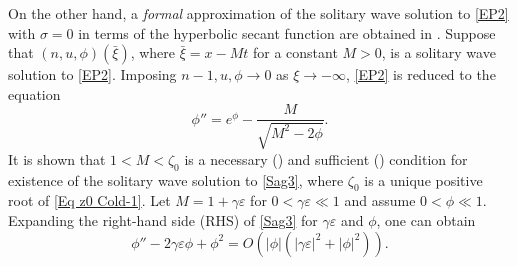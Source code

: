 \documentclass{amsart}
\newcommand{\veps}{\varepsilon}
\numberwithin{equation}{section}
\theoremstyle{plain}%
\theoremstyle{definition}
\theoremstyle{remark}
\theoremstyle{remark}
\begin{document}
On the other hand, a \emph{formal} approximation of the solitary wave solution to \eqref{EP2} with $\sigma=0$ in terms of the hyperbolic secant function are obtained in \cite{Sag}. Suppose that $(n,u,\phi)(\bar{\xi})$, where $\bar{\xi} = x - Mt$ for a constant $M>0$, is a solitary wave solution to \eqref{EP2}. Imposing $n-1, u, \phi \to 0$ as $\xi \to -\infty$, 
\eqref{EP2} is reduced to the equation
\begin{equation}\label{Sag3}
\phi'' = e^\phi - \frac{M}{\sqrt{M^2-2\phi}}.
\end{equation}
It is shown that $1<M<\zeta_0$ is a necessary (\cite{Sag}) and sufficient (\cite{Satt}) condition for existence of the solitary wave solution to \eqref{Sag3}, where $\zeta_0$ is a unique positive root of \eqref{Eq z0 Cold-1}. Let $M=1+\gamma\veps$ for $0<\gamma\veps \ll 1$ and assume $0<\phi\ll 1$. Expanding the right-hand side (RHS) of \eqref{Sag3} for $\gamma\veps$ and $\phi$, one can  obtain
\[
\phi''-2\gamma\veps\phi+\phi^2=O\left(|\phi|(|\gamma\veps|^2 + |\phi|^2) \right).
\]
\end{document}
